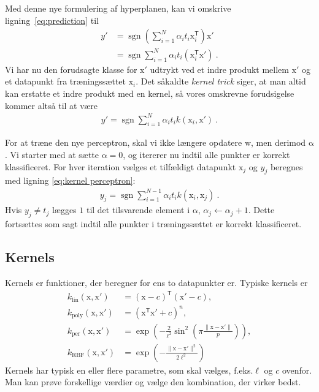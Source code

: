 \documentclass[10pt,twoside]{scrartcl}
\renewcommand{\vec}[1]{\bm{\mathrm{#1}}}        %
\newcommand{\T}{^\mathsf{T}}                    %
\DeclareMathOperator{\sgn}{sgn}                 %
\newcommand{\fx}{f.eks.\xspace}
\begin{document}
Med denne nye formulering af hyperplanen, kan vi omskrive
ligning~\eqref{eq:prediction} til
\begin{align}
    y' &= \sgn\left( \sum_{i = 1}^N \alpha_i t_i \vec x_i\T \right) \vec x' \\
       &= \sgn \sum_{i = 1}^N \alpha_i t_i (\vec x_i\T \vec x') \ .
\end{align}
Vi har nu den forudsagte klasse for $\vec x'$ udtrykt ved et indre produkt
mellem $\vec x'$ og et datapunkt fra træningssættet $\vec x_i$.
Det såkaldte \emph{kernel trick} siger, at man altid kan erstatte et indre
produkt med en kernel, så vores omskrevne forudsigelse kommer altså til at være
\begin{align}
    \label{eq:kernel perceptron}
    y' = \sgn \sum_{i = 1}^N \alpha_i t_i k(\vec x_i, \vec x') \ .
\end{align}

For at træne den nye perceptron, skal vi ikke længere opdatere $\vec w$, men
derimod $\vec\alpha$. Vi starter med at sætte $\vec\alpha = \vec 0$, og
itererer nu indtil alle punkter er korrekt klassificeret. For hver iteration
vælges et tilfældigt datapunkt $\vec x_j$ og $y_j$ beregnes med ligning
\eqref{eq:kernel perceptron}:
\begin{align}
    y_j = \sgn \sum_{i = 1}^{N-1} \alpha_i t_i k(\vec x_i, \vec x_j) \ .
\end{align}
Hvis $y_j \neq t_j$ lægges $1$ til det tilsvarende element i $\vec\alpha$,
$\alpha_j \leftarrow \alpha_j + 1$. Dette fortsættes som sagt indtil alle
punkter i træningssættet er korrekt klassificeret.

\subsection{Kernels}
Kernels er funktioner, der beregner for ens to datapunkter er. Typiske kernels
er
\begin{align}
    \label{eq:kernels}
    k_\text{lin}(\vec x, \vec x') &= (\vec x - c)\T(\vec x' - c), \tag{Lineær}\\
    k_\text{poly}(\vec x, \vec x') &= (\vec x\T\vec x' + c)^n, \tag{Polynoium}\\
    k_\text{per}(\vec x, \vec x') &= \exp\left( -\frac{2}{\ell^2}
    \sin^2\left( \pi \frac{\| \vec x-\vec x'\|}{p}  \right) \right),
    \tag{Periodisk}\\
    k_\text{RBF}(\vec x, \vec x') &= \exp\left( -\frac{\| \vec x - \vec
    x'\|^2}{2\ell^2} \right) \tag{Radial basis function}
\end{align}
Kernels har typisk en eller flere parametre, som skal vælges, \fx $\ell$ og $c$
ovenfor. Man kan prøve forskellige værdier og vælge den kombination, der virker
bedst.
\end{document}
